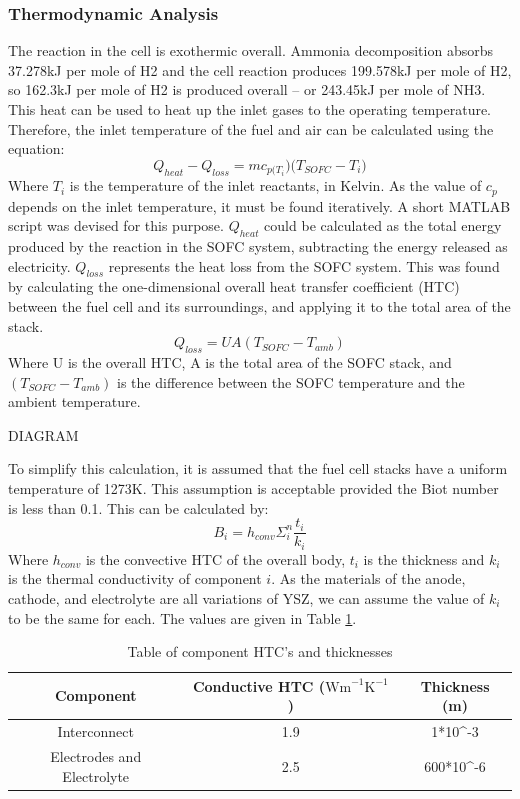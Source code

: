     \subsubsection{Thermodynamic Analysis}
        The reaction in the cell is exothermic overall. Ammonia decomposition absorbs 37.278kJ per mole of H2 and the cell reaction produces 199.578kJ per mole of H2, so 162.3kJ per mole of H2 is produced overall – or 243.45kJ per mole of NH3. This heat can be used to heat up the inlet gases to the operating temperature. Therefore, the inlet temperature of the fuel and air can be calculated using the equation:
\begin{equation}
Q_{heat}- Q_{loss}=mc_{p(T_i} )  (T_{SOFC}-{ T_i)} 				
\end{equation}
Where $T_i$ is the temperature of the inlet reactants, in Kelvin. As the value of $c_p$ depends on the inlet temperature, it must be found iteratively. A short MATLAB script was devised for this purpose. $Q_{heat}$ could be calculated as the total energy produced by the reaction in the SOFC system, subtracting the energy released as electricity.
 $Q_{loss}$ represents the heat loss from the SOFC system. This was found by calculating the one-dimensional overall heat transfer coefficient (HTC) between the fuel cell and its surroundings, and applying it to the total area of the stack.
 \begin{equation}
 Q_{loss}=UA(T_{SOFC}- T_{amb})					
 \end{equation}
Where U is the overall HTC, A is the total area of the SOFC stack, and $(T_{SOFC}- T_{amb})$ is the difference between the SOFC temperature and the ambient temperature.


DIAGRAM


To simplify this calculation, it is assumed that the fuel cell stacks have a uniform temperature of 1273K. This assumption is acceptable provided the Biot number is less than 0.1. This can be calculated by:
\begin{equation}
 B_i=h_{conv} \Sigma_{i}^{n} \frac{t_i}{k_i}  						
 \end{equation}
Where $h_{conv}$ is the convective HTC of the overall body, $t_i$ is the thickness and $k_i$ is the thermal conductivity of component $i$. As the materials of the anode, cathode, and electrolyte are all variations of YSZ, we can assume the value of $k_i$ to be the same for each. The values are given in Table \ref{tbl:HTCcoeff}.

\begin{table}[h!]
\centering
\caption{Table of component HTC's and thicknesses \cite{lewisref11} \cite{lewisref12}}
\label{tbl:HTCcoeff}
\begin{tabular}{|c|c|c|}
\hline
\textbf{Component}         & \textbf{Conductive HTC ($\text{Wm}^{-1}\text{K}^{-1}$)} & \textbf{Thickness (m)}     \\ \hline
Interconnect               & 1.9                               & 1*10^{-3}   \\ \hline
Electrodes and Electrolyte & 2.5                               & 600*10^{-6} \\ \hline
\end{tabular}
\end{table}

